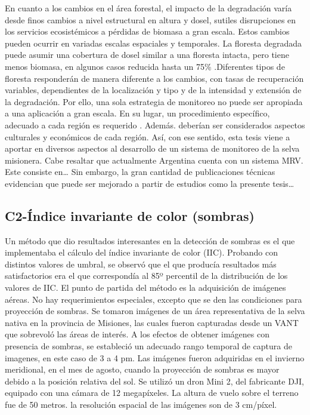 En cuanto a los cambios en el área forestal, el impacto de la degradación varía desde finos cambios a nivel estructural en altura y dosel, sutiles disrupciones en los servicios ecosistémicos a pérdidas de biomasa a gran escala. Estos cambios pueden ocurrir en variadas escalas espaciales y temporales. La floresta degradada puede asumir una cobertura de dosel similar a una floresta intacta, pero tiene menos biomasa, en algunos casos reducida hasta un 75\% \cite{change_report_2006}.Diferentes tipos de floresta responderán de manera diferente a los cambios, con tasas de recuperación variables, dependientes de la localización y tipo y de la intensidad y extensión de la degradación. Por ello, una sola estrategia de monitoreo no puede ser apropiada a una aplicación a gran escala. En su lugar, un procedimiento específico, adecuado a cada región es requerido \cite{mitchell_current_2017}. Además. deberían ser considerados aspectos culturales y económicos de cada región. Así, con ese sentido, esta tesis viene a aportar en diversos aspectos al desarrollo de un sistema de monitoreo de la selva misionera.
Cabe resaltar que actualmente Argentina cuenta con un sistema MRV. Este consiste en…
Sin embargo, la gran cantidad de publicaciones técnicas evidencian que puede ser mejorado a partir de estudios como la presente tesis…

\color{cyan}
\subsection{C2-Índice invariante de color (sombras)}
Un método que dio resultados interesantes en la detección de sombras es el que implementaba el cálculo del índice invariante de color (IIC). Probando con distintos valores de umbral, se observó que el que producía resultados más satisfactorios era el que correspondía al 85º percentil de la distribución de los valores de IIC.
El punto de partida del método es la adquisición de imágenes aéreas. No hay requerimientos especiales, excepto que se den las condiciones para proyección de sombras. Se tomaron imágenes de un área representativa de la selva nativa en la provincia de Misiones, las cuales fueron capturadas desde un VANT que sobrevoló las áreas de interés. A los efectos de obtener imágenes con presencia de sombras, se estableció un adecuado rango temporal de captura de imagenes, en este caso de 3 a 4 pm. Las imágenes fueron adquiridas en el invierno meridional, en el mes de agosto, cuando la proyección de sombras es mayor debido a la posición relativa del sol. Se utilizó un dron Mini 2, del fabricante DJI, equipado con una cámara de 12 megapíxeles. La altura de vuelo sobre el terreno fue de 50 metros. la resolución espacial de las imágenes son de 3 cm/píxel.
